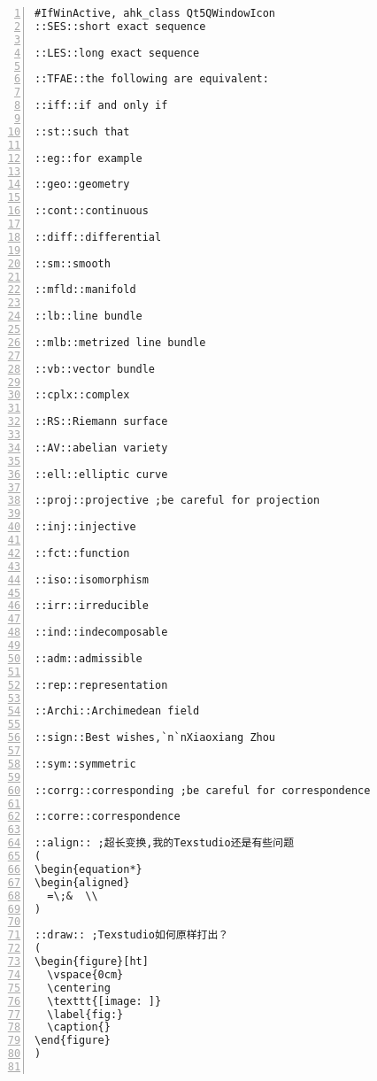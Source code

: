 \documentclass[11pt]{amsart}
\begin{document}
\begin{lstlisting}[numbers=left,numberstyle=\tiny,numbersep=10pt]
#IfWinActive, ahk_class Qt5QWindowIcon
::SES::short exact sequence

::LES::long exact sequence

::TFAE::the following are equivalent:

::iff::if and only if

::st::such that 

::eg::for example

::geo::geometry

::cont::continuous

::diff::differential

::sm::smooth

::mfld::manifold

::lb::line bundle

::mlb::metrized line bundle

::vb::vector bundle

::cplx::complex

::RS::Riemann surface

::AV::abelian variety

::ell::elliptic curve

::proj::projective ;be careful for projection

::inj::injective

::fct::function

::iso::isomorphism

::irr::irreducible

::ind::indecomposable

::adm::admissible

::rep::representation

::Archi::Archimedean field

::sign::Best wishes,`n`nXiaoxiang Zhou

::sym::symmetric

::corrg::corresponding ;be careful for correspondence

::corre::correspondence

::align:: ;超长变换,我的Texstudio还是有些问题
(
\begin{equation*}
\begin{aligned}
  =\;&  \\
)

::draw:: ;Texstudio如何原样打出？
(
\begin{figure}[ht]
  \vspace{0cm}
  \centering
  \texttt{[image: ]}
  \label{fig:}
  \caption{}
\end{figure}
)


\end{lstlisting}
\end{document}
